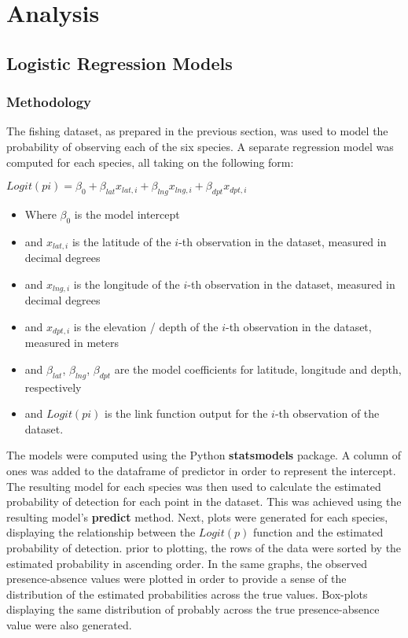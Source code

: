 \section{Analysis}

\subsection{Logistic Regression Models}

\subsubsection{Methodology}

The fishing dataset, as prepared in the previous section, was used to model the probability of observing each of the six species.
A separate regression model was computed for each species, all taking on the following form:\linebreak

\tabto{2cm} ${Logit}(pi) = \beta_0 + \beta_{lat} x_{lat,i} + \beta_{lng} x_{lng,i} + \beta_{dpt} x_{dpt,i}$

\begin{itemize}
    \item Where $\beta_{0}$ is the model intercept
    \item and $x_{lat, i}$ is the latitude of the $i$-th observation in the dataset, measured in decimal degrees
    \item and $x_{lng, i}$ is the longitude of the $i$-th observation in the dataset, measured in decimal degrees
    \item and $x_{dpt, i}$ is the elevation / depth of the $i$-th observation in the dataset, measured in meters
    \item and $\beta_{lat}$, $\beta_{lng}$, $\beta_{dpt}$ are the model coefficients for latitude, longitude and depth, respectively
    \item and ${Logit}(pi)$ is the link function output for the $i$-th observation of the dataset.
\end{itemize}

The models were computed using the Python \textbf{statsmodels} package.
A column of ones was added to the dataframe of predictor in order to represent the intercept.
The resulting model for each species was then used to calculate the estimated probability of detection for each point in the dataset.
This was achieved using the resulting model's \textbf{predict} method.
Next, plots were generated for each species, displaying the relationship between the $Logit(p)$ function and the estimated probability of detection.
prior to plotting, the rows of the data were sorted by the estimated probability in ascending order.
In the same graphs, the observed presence-absence values were plotted in order to provide a sense of the distribution
of the estimated probabilities across the true values.
Box-plots displaying the same distribution of probably across the true presence-absence value were also generated.

